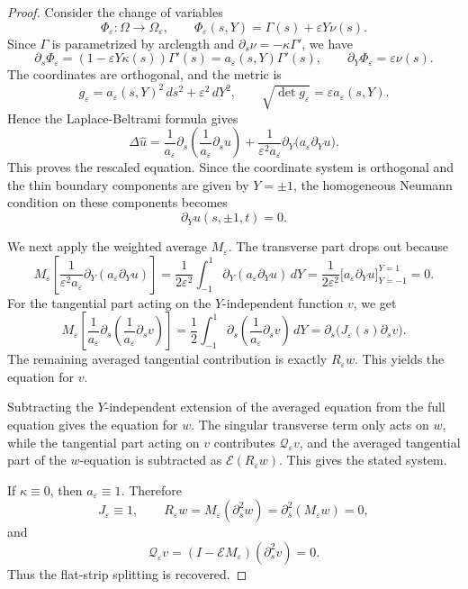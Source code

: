 \documentclass[11pt]{article}
\theoremstyle{definition}
\theoremstyle{remark}
\numberwithin{equation}{section}
\begin{document}
\begin{proof}
Consider the change of variables
\[
\Phi_\varepsilon:\Omega\to\Omega_\varepsilon,
\qquad
\Phi_\varepsilon(s,Y)=\Gamma(s)+\varepsilon Y\nu(s).
\]
Since \(\Gamma\) is parametrized by arclength and
\(\partial_s\nu=-\kappa\Gamma'\), we have
\[
\partial_s\Phi_\varepsilon
=
(1-\varepsilon Y\kappa(s))\Gamma'(s)
=
a_\varepsilon(s,Y)\Gamma'(s),
\qquad
\partial_Y\Phi_\varepsilon
=
\varepsilon\nu(s).
\]
The coordinates are orthogonal, and the metric is
\[
g_\varepsilon
=
a_\varepsilon(s,Y)^2\,ds^2+\varepsilon^2\,dY^2,
\qquad
\sqrt{\det g_\varepsilon}=\varepsilon a_\varepsilon(s,Y).
\]
Hence the Laplace-Beltrami formula gives
\[
\Delta\widehat u
=
\frac{1}{a_\varepsilon}
\partial_s\!\left(\frac{1}{a_\varepsilon}\partial_su\right)
+
\frac{1}{\varepsilon^2a_\varepsilon}
\partial_Y\!\bigl(a_\varepsilon\partial_Yu\bigr).
\]
This proves the rescaled equation. Since the coordinate system is orthogonal
and the thin boundary components are given by \(Y=\pm1\), the homogeneous
Neumann condition on these components becomes
\[
\partial_Yu(s,\pm1,t)=0.
\]

We next apply the weighted average \(M_\varepsilon\). The transverse part drops
out because
\[
M_\varepsilon\!\left[
\frac{1}{\varepsilon^2a_\varepsilon}
\partial_Y(a_\varepsilon\partial_Yu)
\right]
=
\frac{1}{2\varepsilon^2}
\int_{-1}^1
\partial_Y(a_\varepsilon\partial_Yu)\,dY
=
\frac{1}{2\varepsilon^2}
\bigl[a_\varepsilon\partial_Yu\bigr]_{Y=-1}^{Y=1}
=
0.
\]
For the tangential part acting on the \(Y\)-independent function \(v\), we get
\[
M_\varepsilon\!\left[
\frac{1}{a_\varepsilon}
\partial_s\!\left(\frac{1}{a_\varepsilon}\partial_s v\right)
\right]
=
\frac12\int_{-1}^1
\partial_s\!\left(\frac{1}{a_\varepsilon}\partial_s v\right)\,dY
=
\partial_s\!\bigl(J_\varepsilon(s)\partial_s v\bigr).
\]
The remaining averaged tangential contribution is exactly \(R_\varepsilon w\).
This yields the equation for \(v\).

Subtracting the \(Y\)-independent extension of the averaged equation from the
full equation gives the equation for \(w\). The singular transverse term only
acts on \(w\), while the tangential part acting on \(v\) contributes
\(\mathcal Q_\varepsilon v\), and the averaged tangential part of the
\(w\)-equation is subtracted as \(\mathcal E(R_\varepsilon w)\). This gives
the stated system.

If \(\kappa\equiv0\), then \(a_\varepsilon\equiv1\). Therefore
\[
J_\varepsilon\equiv1,\qquad
R_\varepsilon w
=
M_\varepsilon(\partial_s^2w)
=
\partial_s^2(M_\varepsilon w)
=
0,
\]
and
\[
\mathcal Q_\varepsilon v
=
(I-\mathcal E M_\varepsilon)(\partial_s^2v)
=
0.
\]
Thus the flat-strip splitting is recovered.
\end{proof}
\end{document}
